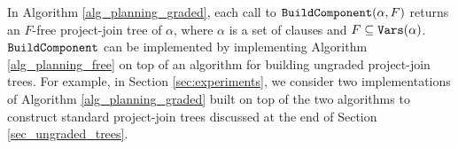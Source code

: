 In Algorithm \ref{alg_planning_graded}, each call to $\texttt{\upshape BuildComponent}(\alpha, F)$ returns an $F$-free project-join tree of $\alpha$, where $\alpha$ is a set of clauses and $F \subseteq \texttt{\upshape Vars}(\alpha)$.
$\texttt{\upshape BuildComponent}$ can be implemented by implementing Algorithm \ref{alg_planning_free} on top of an algorithm for building ungraded project-join trees. 
For example, in Section \ref{sec:experiments}, we consider two implementations of Algorithm \ref{alg_planning_graded} built on top of the two algorithms to construct standard project-join trees \cite{dudek2020dpmc} discussed at the end of Section \ref{sec_ungraded_trees}.



